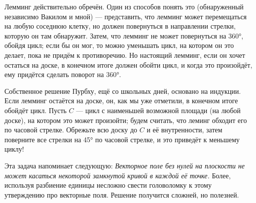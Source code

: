 Лемминг действительно обречён.
Один из способов понять это (обнаруженный независимо Вакилом и мной) --- представить, что лемминг может перемещаться на любую соседнюю клетку, но должен повернуться в направлении стрелки, которую он там обнаружит.
Затем, что лемминг не может повернуться на 360°, обойдя цикл;
если бы он мог, то можно уменьшать цикл, на котором он это делает, пока не придём к противоречию.
Но настоящий лемминг, если он хочет остаться на доске, в конечном итоге должен обойти цикл, и когда это произойдёт, ему придётся сделать поворот на 360°.

Собственное решение Пурбху, ещё со школьных дней, основано на индукции.
Если лемминг остаётся на доске, он, как мы уже отметили, в конечном итоге обойдёт цикл.
Пусть $C$ --- цикл с наименьшей возможной площади (на любой доске), на котором это может произойти; будем считать, что леминг обходит его по часовой стрелке.
Обрежьте всю доску до $C$ и её внутренности, затем поверните все стрелки на 45° по часовой стрелке, и это приведёт к меньшему циклу!

\begin{addedbytheeditors}
Эта задача напоминает следующую: \emph{Векторное поле без нулей на плоскости не может касаться некоторой замкнутой кривой в каждой её точке.}
Более, используя разбиение единицы несложно свести головоломку к этому утверждению про векторные поля.
Решение получится сложней, но полезней.
\end{addedbytheeditors}

